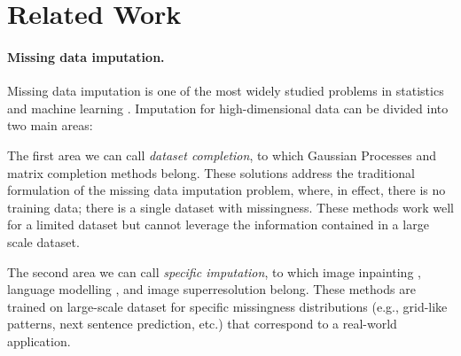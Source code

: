 \documentclass[../thesis.tex]{subfiles}
\begin{document}
\section{Related Work}



\paragraph{Missing data imputation.} Missing data imputation is one of the most widely studied problems in statistics and machine learning \citep{rubinInferenceMissingData1976,campionMultipleImputationNonresponse1989,sterneMultipleImputationMissing2009}. Imputation for high-dimensional data can be divided into two main areas: 

The first area we can call \textit{dataset completion}, to which Gaussian Processes \citep{rasmussenGaussianProcessesMachine2005,jafrastehGaussianProcessesMissing2022} and matrix completion methods \citep{caiSingularValueThresholding2010} belong. These solutions address the traditional formulation of the missing data imputation problem, where, in effect, there is no training data; there is a single dataset with missingness. These methods work well for a limited dataset but cannot leverage the information contained in a large scale dataset. 

The second area we can call \textit{specific imputation}, to which image inpainting \citep{elharroussImageInpaintingReview2020}, language modelling \citep{brownLanguageModelsAre2020a}, and image superresolution \citep{chanSuperresolutionImageReconstruction2007} belong. These methods are trained on large-scale dataset for specific missingness distributions (e.g., grid-like patterns, next sentence prediction, etc.) that correspond to a real-world application.
\end{document}
